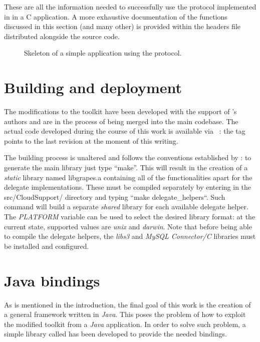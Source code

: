 These are all the information needed to successfully use the
\cloudcast \peersampling protocol implemented in \grapes in a C
application. A more exhaustive documentation of the functions discussed
in this section (and many other) is provided within the headers file
distributed alongside the source code.

\begin{figure}[H]
  \centering
  
  \caption{Skeleton of a simple application using the \cloudcast
    \peersampling protocol.}
  \label{lst:grapes-example-app}
\end{figure}

\section{Building and deployment}
The modifications to the toolkit have been developed with the
support of \grapes's authors and are in the process of being merged
into the main codebase. The actual code developed during the course of
this work is available via \github~\cite{GRAPES-repo}: the tag
\thesistag points to the last revision at the moment of this
writing.

The building process is unaltered and follows the conventions
established by \grapes: to generate the main library just type ``make''. This
will result in the creation of a \emph{static} library named
\textsf{libgrapes.a} containing all of the functionalities apart
for the \cloudhelper delegate implementations. These must be compiled
separately by entering in the \textsf{src/CloudSupport/} directory and
typing ``make delegate\_helpers``. Such command will build a
separate \textit{shared} library for each available delegate
helper. The \textit{PLATFORM} variable can be used to select the
desired library format: at the current state, supported values are
\textit{unix} and \textit{darwin}.
Note that before being able to compile the delegate helpers, the
\emph{libs3} and \emph{MySQL Connector/C} libraries must be
installed and configured.

\section{Java bindings}
As is mentioned in the introduction, the final goal of this work is
the creation of a general framework written in \emph{Java}. This poses
the problem of how to exploit the modified \grapes toolkit from a
\emph{Java} application. In order to solve such problem, a simple
library called \jgrapes has been developed to provide the needed
bindings.

